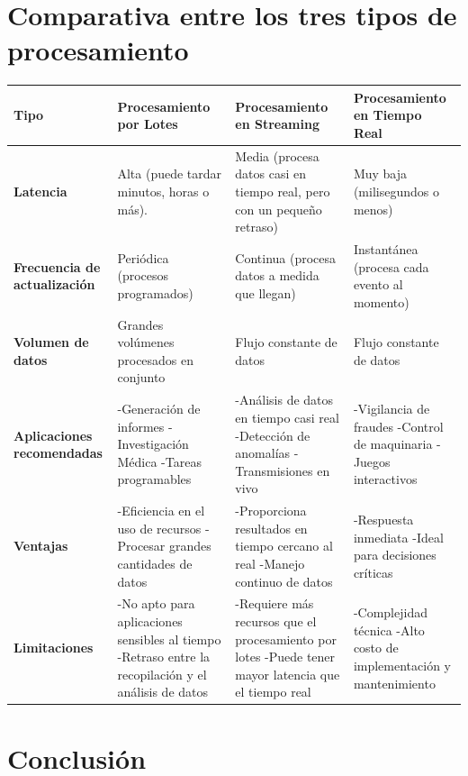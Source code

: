 \documentclass[12pt]{article}
\begin{document}
\clearpage
\section{Comparativa entre los tres tipos de procesamiento}

\renewcommand{\arraystretch}{2} %

\begin{tabularx}{\textwidth}{|>{\raggedright\arraybackslash}X|>{\raggedright\arraybackslash}X|>{\raggedright\arraybackslash}X|>{\raggedright\arraybackslash}X|}
    \hline
    \textbf{Tipo} & \textbf{Procesamiento por Lotes} & \textbf{Procesamiento en Streaming} & \textbf{Procesamiento en Tiempo Real} \\
    \hline
    \textbf{Latencia} & Alta (puede tardar minutos, horas o más). & Media (procesa datos casi en tiempo real, pero con un pequeño retraso) & Muy baja (milisegundos o menos) \\
    \hline
    \textbf{Frecuencia de actualización} & Periódica (procesos programados) & Continua (procesa datos a medida que llegan) & Instantánea (procesa cada evento al momento)\\
    \hline
    \textbf{Volumen de datos} & Grandes volúmenes procesados en conjunto & Flujo constante de datos & Flujo constante de datos \\
    \hline
    \textbf{Aplicaciones recomendadas} & -Generación de informes -Investigación Médica  -Tareas programables & -Análisis de datos en tiempo casi real -Detección de anomalías -Transmisiones en vivo & -Vigilancia de fraudes -Control de maquinaria -Juegos interactivos \\
    \hline
    \textbf{Ventajas} & -Eficiencia en el uso de recursos -Procesar grandes cantidades de datos & -Proporciona resultados en tiempo cercano al real -Manejo continuo de datos & -Respuesta inmediata -Ideal para decisiones críticas \\
    \hline
    \textbf{Limitaciones} & -No apto para aplicaciones sensibles al tiempo -Retraso entre la recopilación y el análisis de datos &  -Requiere más recursos que el procesamiento por lotes -Puede tener mayor latencia que el tiempo real & -Complejidad técnica -Alto costo de implementación y mantenimiento \\
    \hline
\end{tabularx}

\clearpage

\section{Conclusión}
\end{document}
